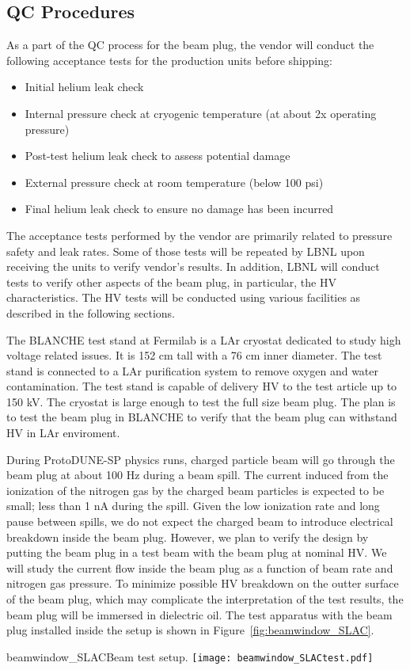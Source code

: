 \subsection{QC Procedures}

As a part of the QC process for the beam plug, the vendor will conduct the following acceptance tests for the production units before shipping:
\begin{itemize}
\item {Initial helium leak check}
\item {Internal pressure check at cryogenic temperature (at about 2x operating pressure)}
\item {Post-test helium leak check to assess potential damage}
\item {External pressure check at room temperature (below 100 psi)}
\item {Final helium leak check to ensure no damage has been incurred}
\end{itemize}

The acceptance tests performed by the vendor are primarily related to pressure safety and leak rates. Some of those tests will be repeated by LBNL upon receiving the units to verify vendor's results. In addition, LBNL will conduct tests to verify other aspects of the beam plug, in particular, the HV characteristics. The HV tests will be conducted using various facilities as described in the following sections.

The BLANCHE test stand at Fermilab is a LAr cryostat dedicated to study high voltage related issues. It is 152 cm tall with a 76 cm inner diameter. The test stand is connected to a LAr purification system to remove oxygen and water contamination. The test stand is capable of delivery HV to the test article up to 150 kV. The cryostat is large enough to test the full size beam plug. The plan is to test the beam plug in BLANCHE to verify that the beam plug can withstand HV in LAr enviroment.

During ProtoDUNE-SP physics runs, charged particle beam will go through the beam plug at about 100 Hz during a beam spill. The current induced from the ionization of the nitrogen gas by the charged beam particles is expected to be small; less than 1 nA during the spill. Given the low ionization rate and long pause between spills, we do not expect the charged beam to introduce electrical breakdown inside the beam plug. However, we plan to verify the design by putting the beam plug in a test beam with the beam plug at nominal HV. We will study the current flow inside the beam plug as a function of beam rate and nitrogen gas pressure. To minimize possible HV breakdown on the outter surface of the beam plug, which may complicate the interpretation of the test results, the beam plug will be immersed in dielectric oil. The test apparatus with the beam plug installed inside the setup is shown in Figure~\ref{fig:beamwindow_SLAC}.
\begin{cdrfigure}{beamwindow_SLAC}{Beam test setup.}
  \texttt{[image: beamwindow\_SLACtest.pdf]}
\end{cdrfigure}

